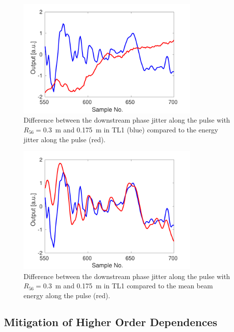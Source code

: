 \begin{figure}
  \centering
  \includegraphics[width=0.8\textwidth]{Figures/propagation/stdPhaseVsStdEnergyAlong}
  \caption{Difference between the downstream phase jitter along the pulse with \(R_{56} = 0.3\)~m and 0.175~m in TL1 (blue) compared to the energy jitter along the pulse (red).}
  \label{f:stdPhaseVsStdEnergyAlong}
\end{figure}

\begin{figure}
  \centering
  \includegraphics[width=0.8\textwidth]{Figures/propagation/stdPhaseVsMeanEnergyAlong}
  \caption{Difference between the downstream phase jitter along the pulse with \(R_{56} = 0.3\)~m and 0.175~m in TL1 compared to the mean beam energy along the pulse (red).}
  \label{f:stdPhaseVsMeanEnergyAlong}
\end{figure}

\subsection{Mitigation of Higher Order Dependences}
\label{ss:t566Mitigation}

